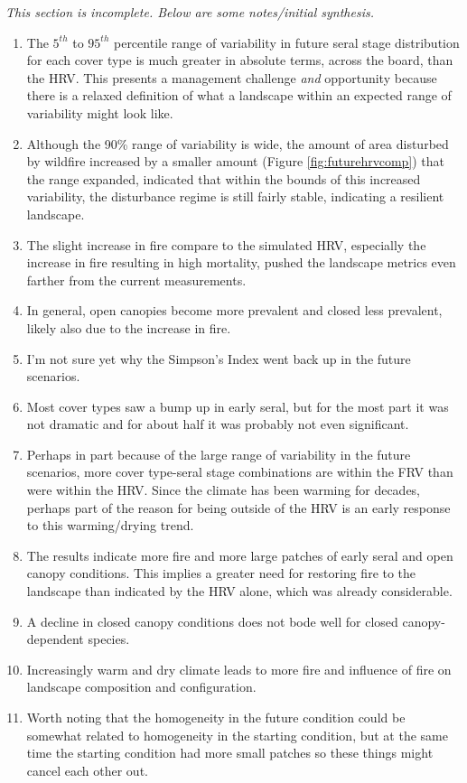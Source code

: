 \documentclass[12pt]{article}
\begin{document}
\begin{spacing}{1}
\emph{This section is incomplete. Below are some notes/initial synthesis.}
\begin{enumerate}
	\item The $5^{th}$ to $95^{th}$ percentile range of variability in future seral stage distribution for each cover type is much greater in absolute terms, across the board, than the HRV. This presents a management challenge \emph{and} opportunity because there is a relaxed definition of what a landscape within an expected range of variability might look like.
	\item Although the 90\% range of variability is wide, the amount of area disturbed by wildfire increased by a smaller amount (Figure \ref{fig:futurehrvcomp}) that the range expanded, indicated that within the bounds of this increased variability, the disturbance regime is still fairly stable, indicating a resilient landscape. 
	\item The slight increase in fire compare to the simulated HRV, especially the increase in fire resulting in high mortality, pushed the landscape metrics even farther from the current measurements.
	\item In general, open canopies become more prevalent and closed less prevalent, likely also due to the increase in fire. 
	\item I'm not sure yet why the Simpson's Index went back up in the future scenarios.
	\item Most cover types saw a bump up in early seral, but for the most part it was not dramatic and for about half it was probably not even significant.
	\item Perhaps in part because of the large range of variability in the future scenarios, more cover type-seral stage combinations are within the FRV than were within the HRV. Since the climate has been warming for decades, perhaps part of the reason for being outside of the HRV is an early response to this warming/drying trend.
	\item The results indicate more fire and more large patches of early seral and open canopy conditions. This implies a greater need for restoring fire to the landscape than indicated by the HRV alone, which was already considerable.
	\item A decline in closed canopy conditions does not bode well for closed canopy-dependent species.
	\item Increasingly warm and dry climate leads to more fire and influence of fire on landscape composition and configuration.
	\item Worth noting that the homogeneity in the future condition could be somewhat related to homogeneity in the starting condition, but at the same time the starting condition had more small patches so these things might cancel each other out.

\end{enumerate}
\end{spacing}
\end{document}
